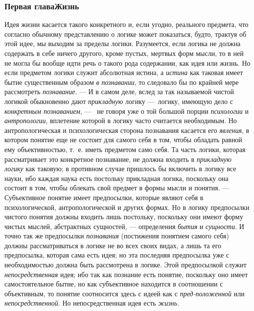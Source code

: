 \documentclass[twoside]{article}
\begin{document}
{{{\subsubsection[Первая глава Жизнь]{Первая глава\newline Жизнь}
Идея жизни касается такого конкретного и, если угодно,
реального предмета, что согласно обычному представлению о логике может
показаться, будто, трактуя об этой идее, мы выходим за пределы логики.
Разумеется, если логика не должна содержать в себе ничего другого, кроме
пустых, мертвых форм мысли, то в ней не могла бы вообще идти речь о такого
рода содержании, как идея или жизнь. Но если предметом логики служит
абсолютная истина, а {\em истина}
как таковая имеет бытие существенным образом
{\em в познавании}, то
следовало бы по крайней мере рассмотреть
{\em познавание}. — И в
самом деле, вслед за так называемой чистой логикой обыкновенно дают
{\em прикладную} логику
—~логику, имеющую дело с
{\em конкретным познаванием}, —
\ не говоря уже о той большой порции
{\em психологии} и
{\em антропологии},
вплетение которой в логику часто считается необходимым. Но
антропологическая и психологическая сторона познавания касается его
{\em явления}, в котором
понятие еще не состоит для самого себя в том, чтобы обладать равной ему
объективностью, т.~е. иметь предметом само себя. Та часть логики, которая
рассматривает это конкретное познавание, не должна входить в
{\em прикладную логику}
как таковую; в противном случае пришлось бы включить в логику
все науки, ибо каждая наука есть постольку прикладная логика, поскольку она
состоит в том, чтобы облекать свой предмет в формы мысли и понятия. —
Субъективное понятие имеет предпосылки, которые являют себя в
психологической, антропологической и других формах. Но в логику предпосылки
чистого понятия должны входить лишь постольку, поскольку они имеют форму
чистых мыслей, абстрактных сущностей, — определения
{\em бытия} и {\em сущности}. И точно
так же предпосылки {\em познавания}
(постижения понятием самого себя) должны
рассматриваться в логике не во всех своих видах, а лишь та
его предпосылка, которая сама есть идея; но эта последняя предпосылка уже с
необходимостью должна быть рассмотрена в логике. Этой предпосылкой служит
{\em непосредственная}
идея; ибо так как познание есть понятие, поскольку оно имеет
самостоятельное бытие, но как субъективное находится в соотношении с
объективным, то понятие соотносится здесь с идеей как с
{\em пред-положенной} или
{\em непосредственной}.
Но непосредственная идея есть
{\em жизнь}.

}}}
\end{document}
